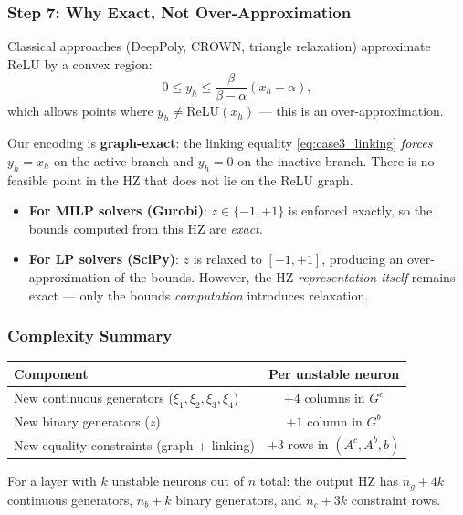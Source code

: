 \documentclass{article}
\begin{document}
\subsubsection{Step 7: Why Exact, Not Over-Approximation}
\label{sec:step7_exact}

Classical approaches (DeepPoly, CROWN, triangle relaxation) approximate ReLU by a convex region:
\[
0 \leq y_h \leq \frac{\beta}{\beta - \alpha}(x_h - \alpha),
\]
which allows points where $y_h \neq \mathrm{ReLU}(x_h)$ --- this is an over-approximation.

Our encoding is \textbf{graph-exact}: the linking equality \eqref{eq:case3_linking} \emph{forces} $y_h = x_h$ on the active branch and $y_h = 0$ on the inactive branch. There is no feasible point in the HZ that does not lie on the ReLU graph.

\begin{itemize}
    \item \textbf{For MILP solvers (Gurobi)}: $z \in \{-1, +1\}$ is enforced exactly, so the bounds computed from this HZ are \emph{exact}.
    \item \textbf{For LP solvers (SciPy)}: $z$ is relaxed to $[-1, +1]$, producing an over-approximation of the bounds. However, the HZ \emph{representation itself} remains exact --- only the bounds \emph{computation} introduces relaxation.
\end{itemize}

\subsubsection{Complexity Summary}
\label{sec:complexity}

\begin{center}
\begin{tabular}{@{}lc@{}}
\toprule
Component & Per unstable neuron \\
\midrule
New continuous generators ($\xi_1, \xi_2, \xi_3, \xi_4$) & $+4$ columns in $G^c$ \\
New binary generators ($z$) & $+1$ column in $G^b$ \\
New equality constraints (graph + linking) & $+3$ rows in $(A^c, A^b, b)$ \\
\bottomrule
\end{tabular}
\end{center}

For a layer with $k$ unstable neurons out of $n$ total: the output HZ has $n_g + 4k$ continuous generators, $n_b + k$ binary generators, and $n_c + 3k$ constraint rows.
\end{document}
